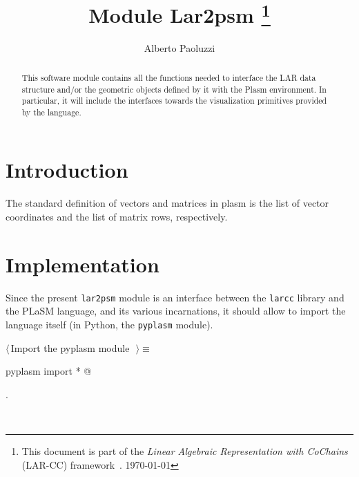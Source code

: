 \documentclass[11pt,oneside]{article}	%
\title{Module Lar2psm
\footnote{This document is part of the \emph{Linear Algebraic Representation with CoChains} (LAR-CC) framework~\cite{cclar-proj:2013:00}. \today}
}
\author{Alberto Paoluzzi}
\begin{document}
\maketitle

\begin{abstract}
This software module contains all the functions needed to interface the LAR data structure and/or the geometric  objects defined by it with the Plasm environment. In particular, it will include the interfaces towards the visualization primitives provided by the language.
\end{abstract}



\tableofcontents
\newpage

\section{Introduction}
The standard definition of vectors and matrices in plasm is the list of vector coordinates and the list of matrix rows, respectively.

\section{Implementation}

Since the present \texttt{lar2psm} module is an interface between the \texttt{larcc} library and the PLaSM language, and its various incarnations, it should allow to import the language itself (in Python, the \texttt{pyplasm} module). 
\begin{flushleft} \small
\begin{minipage}{\linewidth} \label{scrap1}
$\langle\,$Import the pyplasm module\nobreak\ {\footnotesize {}}$\,\rangle\equiv$
\vspace{-1ex}
\begin{list}{}{} \item
\mbox{}\verb@from pyplasm import * @\\
\mbox{}\verb@@{\NWsep}
\end{list}
\vspace{-1ex}
\footnotesize\addtolength{\baselineskip}{-1ex}
\begin{list}{}{\setlength{\itemsep}{-\parsep}\setlength{\itemindent}{-\leftmargin}}
\item {\NWtxtMacroNoRef}.
\end{list}
\end{minipage}\\[4ex]
\end{flushleft}
\end{document}
